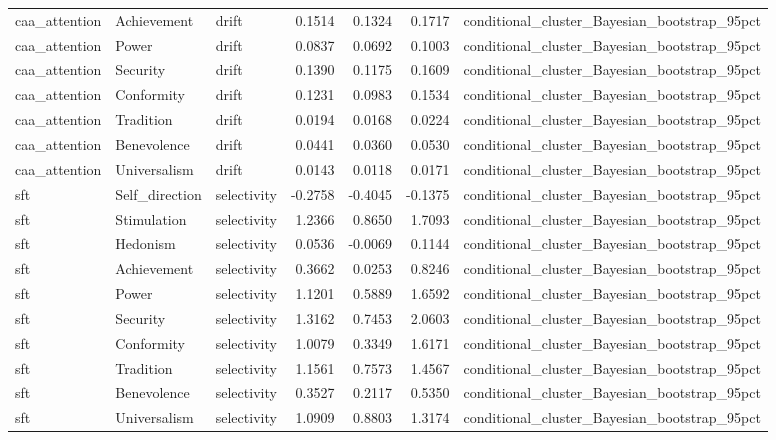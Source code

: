 \begin{tabular}{lllrrrl}
caa\_attention & Achievement & drift & 0.1514 & 0.1324 & 0.1717 & conditional\_cluster\_Bayesian\_bootstrap\_95pct \\
caa\_attention & Power & drift & 0.0837 & 0.0692 & 0.1003 & conditional\_cluster\_Bayesian\_bootstrap\_95pct \\
caa\_attention & Security & drift & 0.1390 & 0.1175 & 0.1609 & conditional\_cluster\_Bayesian\_bootstrap\_95pct \\
caa\_attention & Conformity & drift & 0.1231 & 0.0983 & 0.1534 & conditional\_cluster\_Bayesian\_bootstrap\_95pct \\
caa\_attention & Tradition & drift & 0.0194 & 0.0168 & 0.0224 & conditional\_cluster\_Bayesian\_bootstrap\_95pct \\
caa\_attention & Benevolence & drift & 0.0441 & 0.0360 & 0.0530 & conditional\_cluster\_Bayesian\_bootstrap\_95pct \\
caa\_attention & Universalism & drift & 0.0143 & 0.0118 & 0.0171 & conditional\_cluster\_Bayesian\_bootstrap\_95pct \\
sft & Self\_direction & selectivity & -0.2758 & -0.4045 & -0.1375 & conditional\_cluster\_Bayesian\_bootstrap\_95pct \\
sft & Stimulation & selectivity & 1.2366 & 0.8650 & 1.7093 & conditional\_cluster\_Bayesian\_bootstrap\_95pct \\
sft & Hedonism & selectivity & 0.0536 & -0.0069 & 0.1144 & conditional\_cluster\_Bayesian\_bootstrap\_95pct \\
sft & Achievement & selectivity & 0.3662 & 0.0253 & 0.8246 & conditional\_cluster\_Bayesian\_bootstrap\_95pct \\
sft & Power & selectivity & 1.1201 & 0.5889 & 1.6592 & conditional\_cluster\_Bayesian\_bootstrap\_95pct \\
sft & Security & selectivity & 1.3162 & 0.7453 & 2.0603 & conditional\_cluster\_Bayesian\_bootstrap\_95pct \\
sft & Conformity & selectivity & 1.0079 & 0.3349 & 1.6171 & conditional\_cluster\_Bayesian\_bootstrap\_95pct \\
sft & Tradition & selectivity & 1.1561 & 0.7573 & 1.4567 & conditional\_cluster\_Bayesian\_bootstrap\_95pct \\
sft & Benevolence & selectivity & 0.3527 & 0.2117 & 0.5350 & conditional\_cluster\_Bayesian\_bootstrap\_95pct \\
sft & Universalism & selectivity & 1.0909 & 0.8803 & 1.3174 & conditional\_cluster\_Bayesian\_bootstrap\_95pct \\

\end{tabular}
